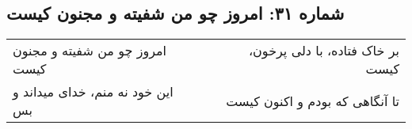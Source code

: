\begin{center}
\section*{شماره ۳۱: امروز چو من شفیته و مجنون کیست}
\label{sec:031}
\begin{longtable}{l p{0.5cm} r}
امروز چو من شفیته و مجنون کیست
&&
بر خاک فتاده، با دلی پرخون، کیست
\\
این خود نه منم، خدای میداند و بس
&&
تا آنگاهی که بودم و اکنون کیست
\\
\end{longtable}
\end{center}
